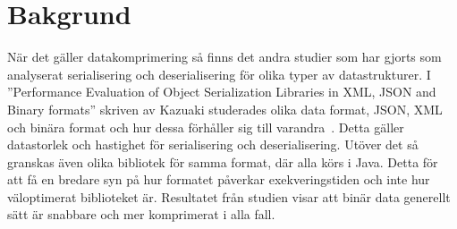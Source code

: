 \section{Bakgrund}
\label{sec:tim-background}
När det gäller datakomprimering så finns det andra studier som har gjorts som analyserat serialisering och deserialisering för olika typer av datastrukturer. I ''Performance Evaluation of Object Serialization Libraries in XML, JSON and Binary formats'' skriven av Kazuaki studerades olika data format, JSON, XML och binära format och hur dessa förhåller sig till varandra~\cite{serialization}. Detta gäller datastorlek och hastighet för serialisering och deserialisering. Utöver det så granskas även olika bibliotek för samma format, där alla körs i Java. Detta för att få en bredare syn på hur formatet påverkar exekveringstiden och inte hur väloptimerat biblioteket är. Resultatet från studien visar att binär data generellt sätt är snabbare och mer komprimerat i alla fall.
